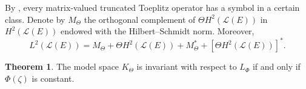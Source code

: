 \documentclass{amsart}
\theoremstyle{definition}
\newtheorem{thm}{Theorem}[section]
\newcommand{\oL }{\mathcal{L}(E) }
\begin{document}
    \medskip
By \cite{RT}, every matrix-valued truncated Toeplitz operator has a symbol in a certain class. Denote by $M_{\Theta}$ the orthogonal complement of $\Theta H^2(\oL)$ in $H^2(\oL)$ endowed with the Hilbert–Schmidt norm. %
%
%
%
Moreover, $$L^2(\oL)=M_{\Theta}+\Theta H^2(\oL)+M_{\Theta}^{*}+[\Theta H^2(\oL)]^{*}.$$

\begin{thm}\label{Phi constant}
The model space $K_{\Theta}$ is invariant with respect to $L_{\Phi}$ if and only if $\Phi(\zeta)$ is constant.
\end{thm}
\end{document}
